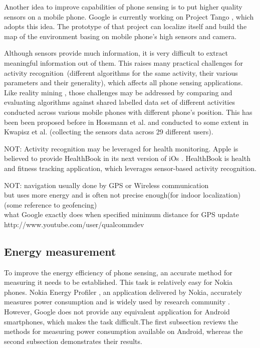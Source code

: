 Another idea to improve capabilities of phone sensing is to put higher quality sensors on a mobile phone. Google is currently working on Project Tango \cite{google:tango}, which adopts this idea. The prototype of that project can localize itself and build the map of the environment basing on mobile phone's high sensors and camera. 		
		
Although sensors provide much information, it is very difficult to extract meaningful information out of them. This raises many practical challenges for activity recognition\ (different algorithms for the same activity, their various parameters and their generality), which affects all phone sensing applications. Like reality mining \cite{eagle:realitymining}, those challenges may be addressed by comparing and evaluating algorithms against shared labelled data set of different activities conducted across various mobile phones with different phone's position. This has been been proposed before in Hossmann et al.\cite{hossmann:bigdatasets} and conducted to some extent in   Kwapisz et al. \cite{Kwapisz2011} (collecting the sensors data across 29 different users).
		
NOT:
	Activity recognition may be leveraged for health monitoring. Apple is believed to provide HealthBook in its next version of iOs \cite{apple:healthbook}. HealthBook is health and fitness tracking application, which leverages sensor-based activity recognition.
		
NOT:
		navigation usually done by GPS or Wireless communication\\
		but uses more energy and is often not precise enough(for indoor localization)\\
			(some reference to geofencing)\\
			 what Google exactly does when specified minimum distance for GPS update\\
			http://www.youtube.com/user/qualcommdev\\
		
\subsection{Energy measurement}
\hspace{10pt} To improve the energy efficiency of phone sensing, an accurate method for measuring it needs to be established. This task is relatively easy for Nokia phones. Nokia Energy Profiler \cite{nokia:profiler}, an application delivered by Nokia,  accurately measures power consumption and is widely used by research community \cite{kjaergaard:entracked} \cite{lu:jigsaw} \cite{li:status}. However, Google does not provide any equivalent application for Android smartphones, which makes the task difficult.The first subsection reviews the methods for measuring power consumption available on Android, whereas the second subsection demonstrates their results.

